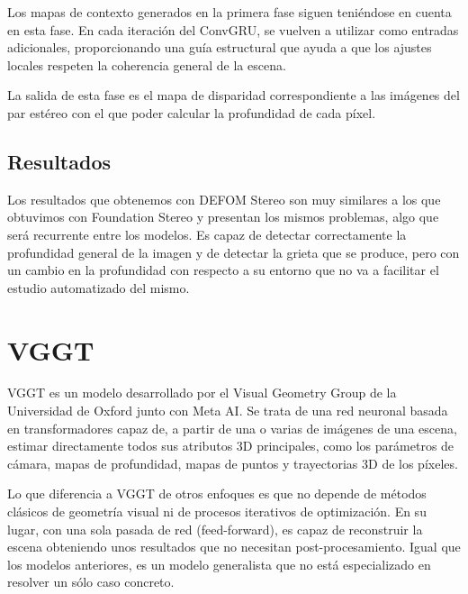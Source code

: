 Los mapas de contexto generados en la primera fase siguen teniéndose en cuenta en esta fase. En cada iteración del ConvGRU, se vuelven a utilizar como entradas adicionales, proporcionando una guía estructural que ayuda a que los ajustes locales respeten la coherencia general de la escena.

La salida de esta fase es el mapa de disparidad correspondiente a las imágenes del par estéreo con el que poder calcular la profundidad de cada píxel.

\subsection{Resultados}
Los resultados que obtenemos con DEFOM Stereo son muy similares a los que obtuvimos con Foundation Stereo y presentan los mismos problemas, algo que será recurrente entre los modelos. Es capaz de detectar correctamente la profundidad general de la imagen y de detectar la grieta que se produce, pero con un cambio en la profundidad con respecto a su entorno que no va a facilitar el estudio automatizado del mismo.


\section{VGGT}
VGGT es un modelo desarrollado por el Visual Geometry Group de la Universidad de Oxford junto con Meta AI. Se trata de una red neuronal basada en transformadores capaz de, a partir de una o varias de imágenes de una escena, estimar directamente todos sus atributos 3D principales, como los parámetros de cámara, mapas de profundidad, mapas de puntos y trayectorias 3D de los píxeles.

Lo que diferencia a VGGT de otros enfoques es que no depende de métodos clásicos de geometría visual ni de procesos iterativos de optimización. En su lugar, con una sola pasada de red (feed-forward), es capaz de reconstruir la escena obteniendo unos resultados que no necesitan post-procesamiento. Igual que los modelos anteriores, es un modelo generalista que no está especializado en resolver un sólo caso concreto.

